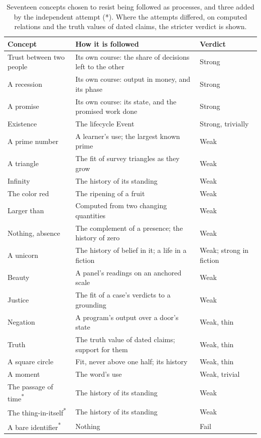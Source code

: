 \documentclass[11pt,a4paper]{article}
\begin{document}
\begin{table}[htbp]
\centering
\small
\begin{tabularx}{\textwidth}{@{}p{}Yp{0.17\textwidth}@{}}
\toprule
Concept & How it is followed & Verdict \\
\midrule
Trust between two people & Its own course: the share of decisions left to the other & Strong \\
A recession & Its own course: output in money, and its phase & Strong \\
A promise & Its own course: its state, and the promised work done & Strong \\
Existence & The lifecycle Event & Strong, trivially \\
A prime number & A learner's use; the largest known prime & Weak \\
A triangle & The fit of survey triangles as they grow & Weak \\
Infinity & The history of its standing & Weak \\
The color red & The ripening of a fruit & Weak \\
Larger than & Computed from two changing quantities & Weak \\
Nothing, absence & The complement of a presence; the history of zero & Weak \\
A unicorn & The history of belief in it; a life in a fiction & Weak; strong in fiction \\
Beauty & A panel's readings on an anchored scale & Weak \\
Justice & The fit of a case's verdicts to a grounding & Weak \\
Negation & A program's output over a door's state & Weak, thin \\
Truth & The truth value of dated claims; support for them & Weak, thin \\
A square circle & Fit, never above one half; its history & Weak, thin \\
A moment & The word's use & Weak, trivial \\
The passage of time\textsuperscript{*} & The history of its standing & Weak \\
The thing-in-itself\textsuperscript{*} & The history of its standing & Weak \\
A bare identifier\textsuperscript{*} & Nothing & Fail \\
\bottomrule
\end{tabularx}
\caption{Seventeen concepts chosen to resist being followed as processes, and
three added by the independent attempt (*). Where the attempts differed, on
computed relations and the truth values of dated claims, the stricter verdict is
shown.}
\label{tab:concepts-as-processes}
\end{table}
\end{document}

